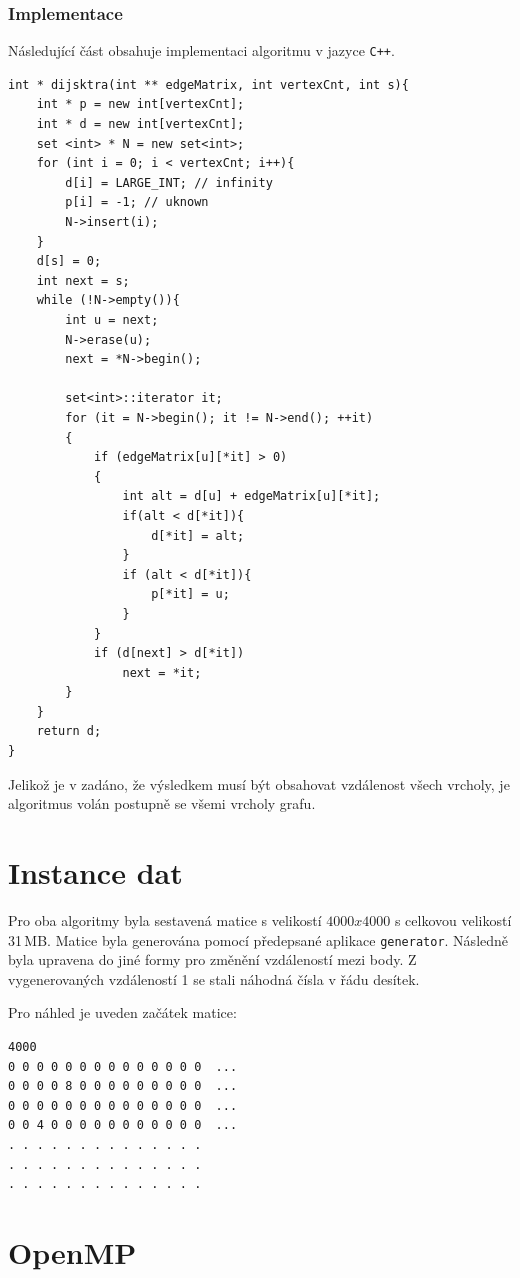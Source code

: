 \documentclass[10pt,a4paper]{article}
\begin{document}
\subsubsection{Implementace}

Následující část obsahuje implementaci algoritmu v jazyce \texttt{C++}.

\begin{verbatim}
int * dijsktra(int ** edgeMatrix, int vertexCnt, int s){
    int * p = new int[vertexCnt];
    int * d = new int[vertexCnt];
    set <int> * N = new set<int>;
    for (int i = 0; i < vertexCnt; i++){
        d[i] = LARGE_INT; // infinity
        p[i] = -1; // uknown
        N->insert(i);
    }
    d[s] = 0;
    int next = s;
    while (!N->empty()){
        int u = next;
        N->erase(u);
        next = *N->begin();

        set<int>::iterator it;
        for (it = N->begin(); it != N->end(); ++it)
        {
            if (edgeMatrix[u][*it] > 0)
            {
                int alt = d[u] + edgeMatrix[u][*it];
				if(alt < d[*it]){
					d[*it] = alt;
				}
                if (alt < d[*it]){
                    p[*it] = u;
                }
            }
            if (d[next] > d[*it])
                next = *it;
        }
    }
    return d;
}
\end{verbatim}

Jelikož je v zadáno, že výsledkem musí být obsahovat vzdálenost všech vrcholy, je algoritmus volán postupně se všemi vrcholy grafu.

\section{Instance dat}

Pro oba algoritmy byla sestavená matice s velikostí $4000x4000$ s celkovou velikostí 31\,MB. Matice byla generována pomocí předepsané aplikace \texttt{generator}. Následně byla upravena do jiné formy pro změnění vzdáleností mezi body. Z vygenerovaných vzdáleností 1 se stali náhodná čísla v řádu desítek.

Pro náhled je uveden začátek matice:

\begin{verbatim}
4000
0 0 0 0 0 0 0 0 0 0 0 0 0 0  ...
0 0 0 0 8 0 0 0 0 0 0 0 0 0  ...
0 0 0 0 0 0 0 0 0 0 0 0 0 0  ...
0 0 4 0 0 0 0 0 0 0 0 0 0 0  ...
. . . . . . . . . . . . . . 
. . . . . . . . . . . . . . 
. . . . . . . . . . . . . . 
\end{verbatim}

\section{OpenMP}
\end{document}
